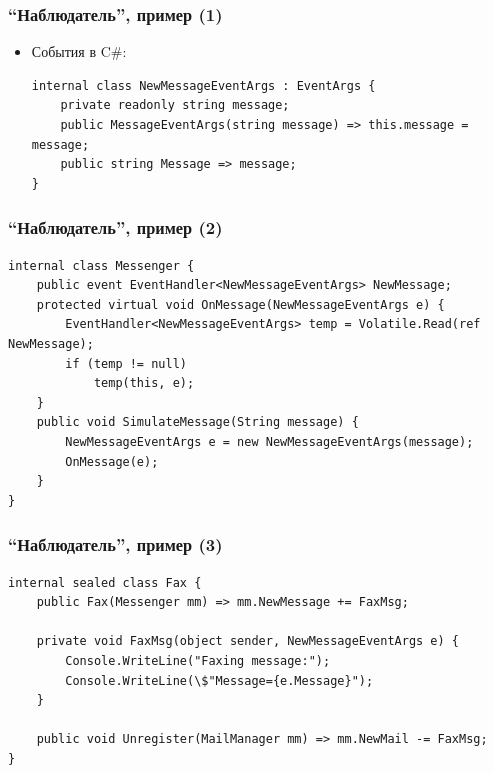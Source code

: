 \documentclass[xetex,mathserif,serif]{beamer}
\begin{document}
\begin{frame}
\begin{columns}
\begin{column}{0.5\textwidth}
\begin{center}
				\end{center}
			\end{column}
		\end{columns}
	\end{frame}

	\begin{frame}[fragile]
		\frametitle{``Наблюдатель'', пример (1)}
		\begin{itemize}
			\item События в C\#:
			\begin{verbatim}
internal class NewMessageEventArgs : EventArgs {
    private readonly string message;
    public MessageEventArgs(string message) => this.message = message;
    public string Message => message;
}
			\end{verbatim}
		\end{itemize}
\end{frame}

	\begin{frame}[fragile]
		\frametitle{``Наблюдатель'', пример (2)}
		\begin{itemize}
			\begin{verbatim}
internal class Messenger {
    public event EventHandler<NewMessageEventArgs> NewMessage;
    protected virtual void OnMessage(NewMessageEventArgs e) {
        EventHandler<NewMessageEventArgs> temp = Volatile.Read(ref NewMessage);
        if (temp != null) 
            temp(this, e);
    }
    public void SimulateMessage(String message) {
        NewMessageEventArgs e = new NewMessageEventArgs(message);
        OnMessage(e);
    }
}
			\end{verbatim}
		\end{itemize}
\end{frame}

	\begin{frame}[fragile]
		\frametitle{``Наблюдатель'', пример (3)}
		\begin{itemize}
			\begin{verbatim}
internal sealed class Fax {
    public Fax(Messenger mm) => mm.NewMessage += FaxMsg;

    private void FaxMsg(object sender, NewMessageEventArgs e) {
        Console.WriteLine("Faxing message:");
        Console.WriteLine(\$"Message={e.Message}");
    }

    public void Unregister(MailManager mm) => mm.NewMail -= FaxMsg;
}
			\end{verbatim}
		\end{itemize}
\end{frame}
\end{document}
